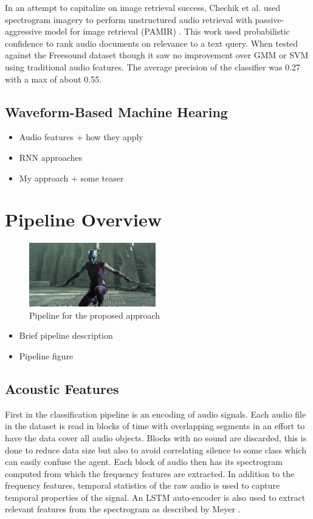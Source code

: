 In an attempt to capitalize on image retrieval success, Chechik et al. used spectrogram imagery to perform unstructured audio retrieval with passive-aggressive model for image retrieval (PAMIR) \cite{Chechik2008}. This work used probabilistic confidence to rank audio documents on relevance to a text query. When tested against the Freesound dataset though it saw no improvement over GMM or SVM using traditional audio features. The average precision of the classifier was 0.27 with a max of about 0.55.

\subsection{Waveform-Based Machine Hearing}
\begin{itemize}
    \item Audio features + how they apply
    \item RNN approaches
    \item My approach + some teaser
\end{itemize}

\section{Pipeline Overview}

\begin{figure}[!h]
    \centering
    \includegraphics[width=0.49\textwidth]{figures/pipeline.jpg}
    \caption{Pipeline for the proposed approach}
    \label{fig:pipeline}
\end{figure}

\begin{itemize}
    \item Brief pipeline description
    \item Pipeline figure
\end{itemize}

\subsection{Acoustic Features}
First in the classification pipeline is an encoding of audio signals. Each audio file in the dataset is read in blocks of time with overlapping segments in an effort to have the data cover all audio objects. Blocks with no sound are discarded, this is done to reduce data size but also to avoid correlating silence to some class which can easily confuse the agent. Each block of audio then has its spectrogram computed from which the frequency features are extracted. In addition to the frequency features, temporal statistics of the raw audio is used to capture temporal properties of the signal. An LSTM auto-encoder is also used to extract relevant features from the spectrogram as described by Meyer \cite{Meyer2017}.

